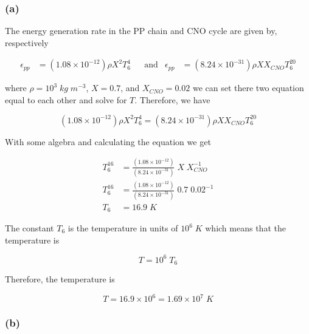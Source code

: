 \documentclass[11pt]{article}
\begin{document}
\subsubsection*{(a)}

The energy generation rate in the PP chain and CNO cycle are given by, respectively

\begin{align*}
    \epsilon_{pp} &= (1.08 \times 10^{-12}) \rho X^{2} T^{4}_{6}
    && \text{and} & 
    \epsilon_{pp} &= (8.24 \times 10^{-31}) \rho X X_{CNO} T^{20}_{6}
\end{align*}

where $\rho = 10^3 \; kg \; m^{-3}$, $X=0.7$, and $X_{CNO} =0.02$ we can set there two equation equal to each other and solve for $T$. Therefore, we have

$$
(1.08 \times 10^{-12}) \rho X^{2} T^{4}_{6} = (8.24 \times 10^{-31}) \rho X X_{CNO} T^{20}_{6}
$$

With some algebra and calculating the equation we get

\begin{align*}
    T_{6}^{16} &= \frac{(1.08 \times 10^{-12}) }{(8.24 \times 10^{-31})} \; X \; X_{CNO}^{-1} \\
    T_{6}^{16} &= \frac{(1.08 \times 10^{-12}) }{(8.24 \times 10^{-31})} \; 0.7 \; 0.02^{-1} \\ 
    T_{6} &= 16.9 \; K
\end{align*}

The constant $T_{6}$ is the temperature in units of $10^{6} \; K$ which means that the temperature is 

$$
T = 10^{6} \; T_{6} 
$$

Therefore, the temperature is 

$$
T = 16.9 \times 10^{6} = 1.69 \times 10^{7} \; K
$$

\newpage

\subsubsection*{(b)}
\end{document}
